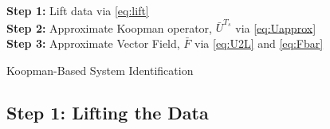 \begin{algorithm}
\SetAlgoLined
{}
\textbf{Step 1:} Lift data via \eqref{eq:lift} \\
\textbf{Step 2:} Approximate Koopman operator, $\bar{U}^{T_s}$ via \eqref{eq:Uapprox} \\
\textbf{Step 3:} Approximate Vector Field, $\bar{F}$ via \eqref{eq:U2L} and \eqref{eq:Fbar} \\
\KwOut{$\bar{\Fv}$}
 \caption{Koopman-Based System Identification}
 \label{alg:sysid}
\end{algorithm}


\subsection{Step 1: Lifting the Data}   \label{sec:step1}

